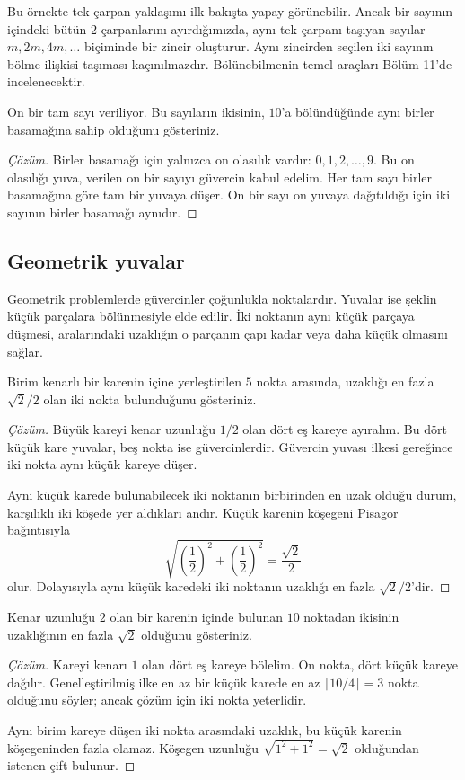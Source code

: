 Bu örnekte tek çarpan yaklaşımı ilk bakışta yapay görünebilir. Ancak bir sayının içindeki bütün $2$ çarpanlarını ayırdığımızda, aynı tek çarpanı taşıyan sayılar $m,2m,4m,\ldots$ biçiminde bir zincir oluşturur. Aynı zincirden seçilen iki sayının bölme ilişkisi taşıması kaçınılmazdır. Bölünebilmenin temel araçları Bölüm 11'de incelenecektir.

\begin{example}
On bir tam sayı veriliyor. Bu sayıların ikisinin, $10$'a bölündüğünde aynı birler basamağına sahip olduğunu gösteriniz.
\end{example}
\begin{proof}[Çözüm]
Birler basamağı için yalnızca on olasılık vardır: $0,1,2,\ldots,9$. Bu on olasılığı yuva, verilen on bir sayıyı güvercin kabul edelim. Her tam sayı birler basamağına göre tam bir yuvaya düşer. On bir sayı on yuvaya dağıtıldığı için iki sayının birler basamağı aynıdır.
\end{proof}

\subsection{Geometrik yuvalar}

Geometrik problemlerde güvercinler çoğunlukla noktalardır. Yuvalar ise şeklin küçük parçalara bölünmesiyle elde edilir. İki noktanın aynı küçük parçaya düşmesi, aralarındaki uzaklığın o parçanın çapı kadar veya daha küçük olmasını sağlar.

\begin{example}
Birim kenarlı bir karenin içine yerleştirilen $5$ nokta arasında, uzaklığı en fazla $\sqrt{2}/2$ olan iki nokta bulunduğunu gösteriniz.
\end{example}
\begin{proof}[Çözüm]
Büyük kareyi kenar uzunluğu $1/2$ olan dört eş kareye ayıralım. Bu dört küçük kare yuvalar, beş nokta ise güvercinlerdir. Güvercin yuvası ilkesi gereğince iki nokta aynı küçük kareye düşer.

Aynı küçük karede bulunabilecek iki noktanın birbirinden en uzak olduğu durum, karşılıklı iki köşede yer aldıkları andır. Küçük karenin köşegeni Pisagor bağıntısıyla
\[
\sqrt{\left(\frac12\right)^2+\left(\frac12\right)^2}
=\frac{\sqrt2}{2}
\]
olur. Dolayısıyla aynı küçük karedeki iki noktanın uzaklığı en fazla $\sqrt2/2$'dir.
\end{proof}

\begin{example}
Kenar uzunluğu $2$ olan bir karenin içinde bulunan $10$ noktadan ikisinin uzaklığının en fazla $\sqrt2$ olduğunu gösteriniz.
\end{example}
\begin{proof}[Çözüm]
Kareyi kenarı $1$ olan dört eş kareye bölelim. On nokta, dört küçük kareye dağılır. Genelleştirilmiş ilke en az bir küçük karede en az $\lceil10/4\rceil=3$ nokta olduğunu söyler; ancak çözüm için iki nokta yeterlidir.

Aynı birim kareye düşen iki nokta arasındaki uzaklık, bu küçük karenin köşegeninden fazla olamaz. Köşegen uzunluğu $\sqrt{1^2+1^2}=\sqrt2$ olduğundan istenen çift bulunur.
\end{proof}

